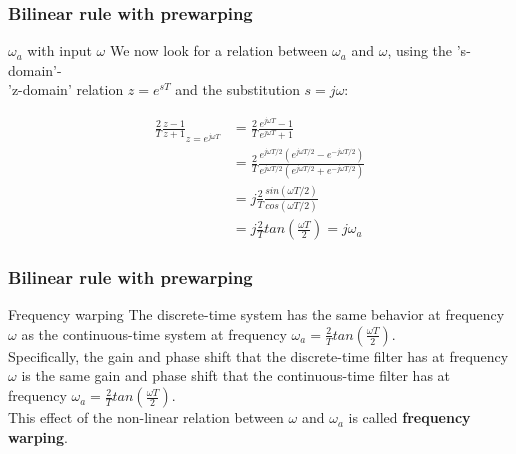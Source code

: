 \begin{frame}
	\frametitle{Bilinear rule with prewarping}
	\begin{block}{$\omega_a$ with input $\omega$}
		We now look for a relation between $\omega_a$ and $\omega$, using the 's-domain'-\\'z-domain' relation $z = e^{sT}$ and the substitution $s=j\omega$:
		\vspace{-2em} 
		\begin{center}
			\begin{align*}
			\frac{2}{T} \frac{z-1}{z+1}_{z = e^{j\omega T}} &=\frac{2}{T} \frac{e^{j\omega T}-1}{e^{j\omega T}+1}\\
			&= \frac{2}{T} \frac{e^{j\omega T/2} (e^{j\omega T/2} - e^{-j\omega T/2})}{e^{j\omega T/2}(e^{j\omega T/2} + e^{-j\omega T/2})}\\
			&= j \frac{2}{T} \frac{sin(\omega T/2)}{cos(\omega T/2)}\\
			&= j \frac{2}{T} tan(\frac{\omega T}{2}) = j\omega_a
			\end{align*}
		\end{center}
	\end{block}
\end{frame}

\begin{frame}
	\frametitle{Bilinear rule with prewarping}
	\begin{block}{Frequency warping}
		The discrete-time system has the same behavior at frequency $\omega$ as the continuous-time system at frequency $\omega_a = \frac{2}{T} tan(\frac{\omega T}{2})$. \\ 
		\vspace{1em}
		Specifically, the gain and phase shift that the discrete-time filter has at frequency $\omega$ is the same gain and phase shift that the continuous-time filter has at frequency  $\omega_a = \frac{2}{T} tan(\frac{\omega T}{2})$.\\
		\vspace{1em}
		This effect of the non-linear relation between $\omega$ and $\omega_a$ is called \textbf{frequency warping}.
	\end{block}
\end{frame}

